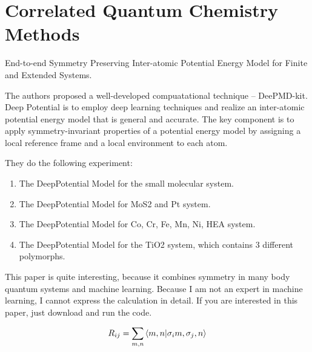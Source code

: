 \documentclass[a4paper]{article}
\numberwithin{equation}{section}
\begin{document}
\section{Correlated Quantum Chemistry Methods}

End-to-end Symmetry Preserving Inter-atomic Potential Energy Model for Finite and Extended
Systems.

The authors proposed a well-developed compuatational technique -- DeePMD-kit. Deep Potential is to 
employ deep learning techniques and 
realize an inter-atomic potential energy model that is general and accurate. 
The key component is to apply symmetry-invariant properties of a potential energy model by assigning a local reference frame and a local environment to each atom. 


They do the following experiment:
\begin{enumerate}
	\item The DeepPotential Model  for the small molecular system. 
	\item The DeepPotential Model for MoS2 and Pt system. 
	\item The DeepPotential Model  for Co, Cr, Fe, Mn, Ni, HEA system. 
	\item The DeepPotential Model for the TiO2 system, which contains 3 different polymorphs.
\end{enumerate}
	
This paper is quite interesting, because it combines symmetry in many body quantum systems and machine learning.
Because I am not an expert in machine learning, I cannot express the calculation in detail. If you are interested
in this paper, just download and run the code.

$$R_{ij}= \sum_{m,n} \braket{m,n|\sigma_i m, \sigma_j, n}$$
\end{document}
